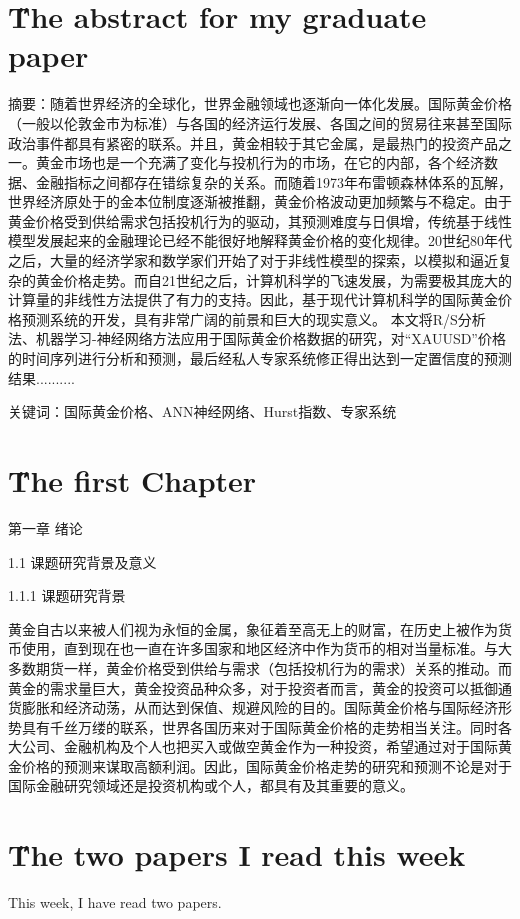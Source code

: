 \documentclass[12pt]{article}
\begin{document}
\section{\H The abstract for my graduate paper}
摘要：随着世界经济的全球化，世界金融领域也逐渐向一体化发展。国际黄金价格（一般以伦敦金市为标准）与各国的经济运行发展、各国之间的贸易往来甚至国际政治事件都具有紧密的联系。并且，黄金相较于其它金属，是最热门的投资产品之一。黄金市场也是一个充满了变化与投机行为的市场，在它的内部，各个经济数据、金融指标之间都存在错综复杂的关系。而随着1973年布雷顿森林体系的瓦解，世界经济原处于的金本位制度逐渐被推翻，黄金价格波动更加频繁与不稳定。由于黄金价格受到供给需求包括投机行为的驱动，其预测难度与日俱增，传统基于线性模型发展起来的金融理论已经不能很好地解释黄金价格的变化规律。20世纪80年代之后，大量的经济学家和数学家们开始了对于非线性模型的探索，以模拟和逼近复杂的黄金价格走势。而自21世纪之后，计算机科学的飞速发展，为需要极其庞大的计算量的非线性方法提供了有力的支持。因此，基于现代计算机科学的国际黄金价格预测系统的开发，具有非常广阔的前景和巨大的现实意义。
本文将R/S分析法、机器学习-神经网络方法应用于国际黄金价格数据的研究，对“XAUUSD”价格的时间序列进行分析和预测，最后经私人专家系统修正得出达到一定置信度的预测结果..........

关键词：国际黄金价格、ANN神经网络、Hurst指数、专家系统

\section{\H The first Chapter}
第一章 绪论

1.1	课题研究背景及意义

1.1.1 课题研究背景

黄金自古以来被人们视为永恒的金属，象征着至高无上的财富，在历史上被作为货币使用，直到现在也一直在许多国家和地区经济中作为货币的相对当量标准。与大多数期货一样，黄金价格受到供给与需求（包括投机行为的需求）关系的推动。而黄金的需求量巨大，黄金投资品种众多，对于投资者而言，黄金的投资可以抵御通货膨胀和经济动荡，从而达到保值、规避风险的目的。国际黄金价格与国际经济形势具有千丝万缕的联系，世界各国历来对于国际黄金价格的走势相当关注。同时各大公司、金融机构及个人也把买入或做空黄金作为一种投资，希望通过对于国际黄金价格的预测来谋取高额利润。因此，国际黄金价格走势的研究和预测不论是对于国际金融研究领域还是投资机构或个人，都具有及其重要的意义。

\section{\H The two papers I read this week}
This week, I have read two papers. 
\end{document}
